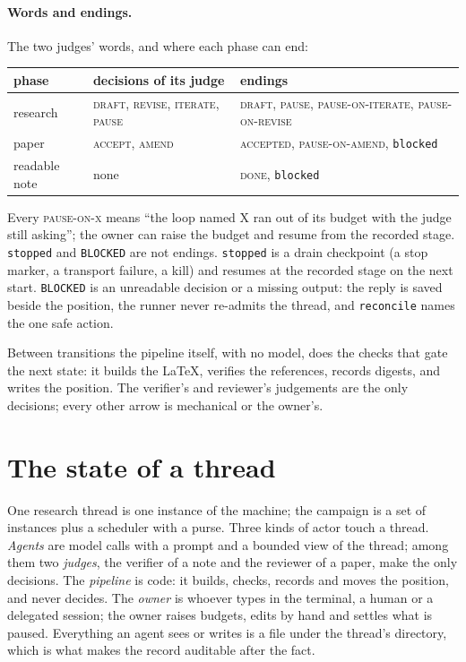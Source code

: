 \documentclass[11pt,a4paper]{article}
\newcommand{\st}[1]{\textsc{#1}}
\newcommand{\file}[1]{\texttt{#1}}
\begin{document}
\paragraph{Words and endings.} The two judges' words, and where each phase can end:
\begin{center}
\small
\begin{tabular}{@{}lll@{}}
\toprule
phase & decisions of its judge & endings \\
\midrule
research & \st{draft}, \st{revise}, \st{iterate}, \st{pause} & \st{draft}, \st{pause}, \st{pause-on-iterate}, \st{pause-on-revise} \\
paper & \st{accept}, \st{amend} & \st{accepted}, \st{pause-on-amend}, \file{blocked} \\
readable note & none & \st{done}, \file{blocked} \\
\bottomrule
\end{tabular}
\end{center}
Every \st{pause-on-x} means ``the loop named X ran out of its budget with the judge still
asking''; the owner can raise the budget and resume from the recorded stage. \file{stopped} and
\file{BLOCKED} are not endings. \file{stopped} is a drain checkpoint (a stop marker, a transport
failure, a kill) and resumes at the recorded stage on the next start. \file{BLOCKED} is an
unreadable decision or a missing output: the reply is saved beside the position, the runner
never re-admits the thread, and \file{reconcile} names the one safe action.

Between transitions the pipeline itself, with no model, does the checks that gate the next
state: it builds the \LaTeX, verifies the references, records digests, and writes the position.
The verifier's and reviewer's judgements are the only decisions; every other arrow is mechanical
or the owner's.

\section{The state of a thread}

One research thread is one instance of the machine; the campaign is a set of instances plus a
scheduler with a purse. Three kinds of actor touch a thread. \emph{Agents} are model calls with a
prompt and a bounded view of the thread; among them two \emph{judges}, the verifier of a note
and the reviewer of a paper, make the only decisions. The \emph{pipeline} is code: it builds,
checks, records and moves the position, and never decides. The \emph{owner} is whoever types in
the terminal, a human or a delegated session; the owner raises budgets, edits by hand and
settles what is paused. Everything an agent sees or writes is a file under the thread's
directory, which is what makes the record auditable after the fact.
\end{document}
